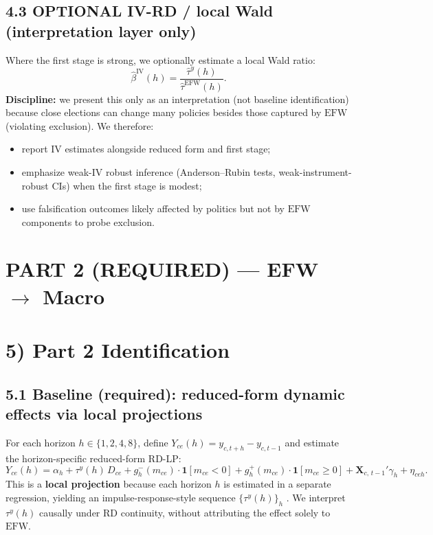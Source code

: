 \documentclass[11pt]{article}
\newcommand{\EFW}{\mathrm{EFW}}
\newcommand{\IV}{\mathrm{IV}}
\newcommand{\bX}{\mathbf{X}}
\newcommand{\1}{\mathbf{1}}
\newcommand{\cid}{c}
\newcommand{\eid}{e}
\begin{document}
\subsection*{4.3 OPTIONAL IV-RD / local Wald (interpretation layer only)}
Where the first stage is strong, we optionally estimate a local Wald ratio:
\[
\widehat{\beta}^{\IV}(h) = \frac{\widehat{\tau}^{y}(h)}{\widehat{\tau}^{\EFW}(h)}.
\]
\textbf{Discipline:} we present this only as an interpretation (not baseline identification) because close elections can change many policies besides those captured by $\EFW$ (violating exclusion). We therefore:
\begin{itemize}[leftmargin=1.2em]
\item report $\IV$ estimates alongside reduced form and first stage;
\item emphasize weak-$\IV$ robust inference (Anderson--Rubin tests, weak-instrument-robust CIs) when the first stage is modest;
\item use falsification outcomes likely affected by politics but not by $\EFW$ components to probe exclusion.
\end{itemize}

\section*{PART 2 (REQUIRED) --- EFW $\rightarrow$ Macro}

\section*{5) Part 2 Identification}

\subsection*{5.1 Baseline (required): reduced-form dynamic effects via local projections}
For each horizon $h\in\{1,2,4,8\}$, define $Y_{\cid \eid}(h)=y_{\cid,t+h}-y_{\cid,t-1}$ and estimate the horizon-specific reduced-form RD-LP:
\begin{equation}
Y_{\cid \eid}(h) = \alpha_h + \tau^{y}(h)\, D_{\cid \eid} + g_{h}^{-}(m_{\cid \eid})\cdot \1[m_{\cid \eid}<0] + g_{h}^{+}(m_{\cid \eid})\cdot \1[m_{\cid \eid}\ge 0] + \bX_{\cid,\,t-1}'\gamma_h + \eta_{\cid \eid h}.
\label{eq:lp_rf}
\end{equation}
This is a \textbf{local projection} because each horizon $h$ is estimated in a separate regression, yielding an impulse-response-style sequence $\{\tau^{y}(h)\}_h$ \citep{Jorda2005}. We interpret $\tau^{y}(h)$ causally under RD continuity, without attributing the effect solely to $\EFW$.
\end{document}

